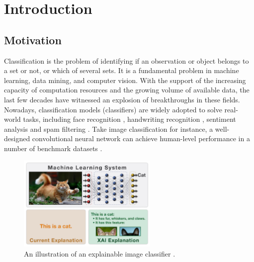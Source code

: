 \chapter{Introduction}\label{sec-introduction}
\section{Motivation}


Classification is the problem of identifying if an observation or object belongs to a set or not, or which of several sets. It is a fundamental problem in machine learning, data mining, and computer vision. With the support of the increasing capacity of computation resources and the growing volume of available data, the last few decades have witnessed an explosion of breakthroughs in these fields. Nowadays, classification models (classifiers) are widely adopted to solve real-world tasks, including face recognition \cite{wright2009robust}, handwriting recognition \cite{lecun1990handwritten}, sentiment analysis \cite{pang2002thumbs} and spam filtering \cite{androutsopoulos2000spam}. Take image classification for instance, a well-designed convolutional neural network can achieve human-level performance in a number of benchmark datasets \cite{he2016resnet}.


\begin{figure}[hb]
  \centering
  \includegraphics[width=0.6\textwidth]{figure/explain_cat}
  \caption{An illustration of an explainable image classifier \cite{darpa2017xai}.}
  \label{fig:explain-cat}
\end{figure}

